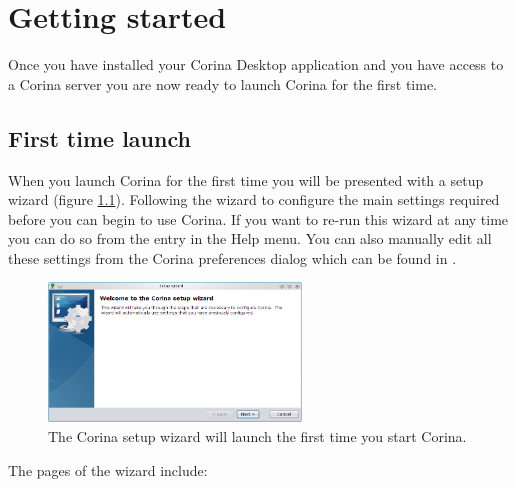 
\chapter{Getting started}

Once you have installed your Corina Desktop application and you have access to a Corina server you are now ready to launch Corina for the first time.

\section{First time launch}
When you launch Corina for the first time you will be presented with a setup wizard (figure \ref{fig:setupwizard}).  Following the wizard to configure the main settings required before you can begin to use Corina.  If you want to re-run this wizard at any time you can do so from the entry in the Help menu. You can also manually edit all these settings from the Corina preferences dialog which can be found in .

\begin{figure}[hbtp]
  \centering
    \includegraphics[width=0.6\textwidth]{Images/setupwizard.png}
  \caption{The Corina setup wizard will launch the first time you start Corina.}
  \label{fig:setupwizard}
\end{figure}

The pages of the wizard include:

